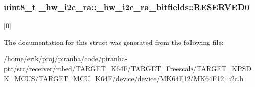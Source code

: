 \subsubsection[{\texorpdfstring{R\+E\+S\+E\+R\+V\+E\+D0}{RESERVED0}}]{\setlength{\rightskip}{0pt plus 5cm}uint8\+\_\+t \+\_\+hw\+\_\+i2c\+\_\+ra\+::\+\_\+hw\+\_\+i2c\+\_\+ra\+\_\+bitfields\+::\+R\+E\+S\+E\+R\+V\+E\+D0}\hypertarget{struct__hw__i2c__ra_1_1__hw__i2c__ra__bitfields_af1e5fea56e3c53756deb857f4554e4c5}{}\label{struct__hw__i2c__ra_1_1__hw__i2c__ra__bitfields_af1e5fea56e3c53756deb857f4554e4c5}
\mbox{[}0\mbox{]} 

The documentation for this struct was generated from the following file\+:\begin{DoxyCompactItemize}
\item 
/home/erik/proj/piranha/code/piranha-\/ptc/src/receiver/mbed/\+T\+A\+R\+G\+E\+T\+\_\+\+K64\+F/\+T\+A\+R\+G\+E\+T\+\_\+\+Freescale/\+T\+A\+R\+G\+E\+T\+\_\+\+K\+P\+S\+D\+K\+\_\+\+M\+C\+U\+S/\+T\+A\+R\+G\+E\+T\+\_\+\+M\+C\+U\+\_\+\+K64\+F/device/device/\+M\+K64\+F12/M\+K64\+F12\+\_\+i2c.\+h\end{DoxyCompactItemize}

